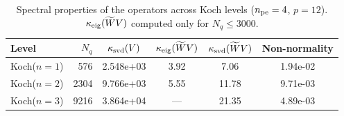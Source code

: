 \begin{table}[ht]
\centering
\caption{Spectral properties of the operators across Koch levels ($n_{\rm pe}=4$, $p=12$). $\kappa_{\rm eig}(\widetilde{W}V)$ computed only for $N_q\leq3000$.}
\label{tab:conditioning}
\begin{tabular}{@{}lrcccc@{}}
\toprule
Level & $N_q$ & $\kappa_{\rm svd}(V)$ & $\kappa_{\rm eig}(\widetilde{W}V)$ & $\kappa_{\rm svd}(\widetilde{W}V)$ & Non-normality \\
\midrule
  Koch($n=1$) & 576 & 2.548e+03 & 3.92 & 7.06 & 1.94e-02 \\
  Koch($n=2$) & 2304 & 9.766e+03 & 5.55 & 11.78 & 9.71e-03 \\
  Koch($n=3$) & 9216 & 3.864e+04 & — & 21.35 & 4.89e-03 \\
\bottomrule
\end{tabular}
\end{table}